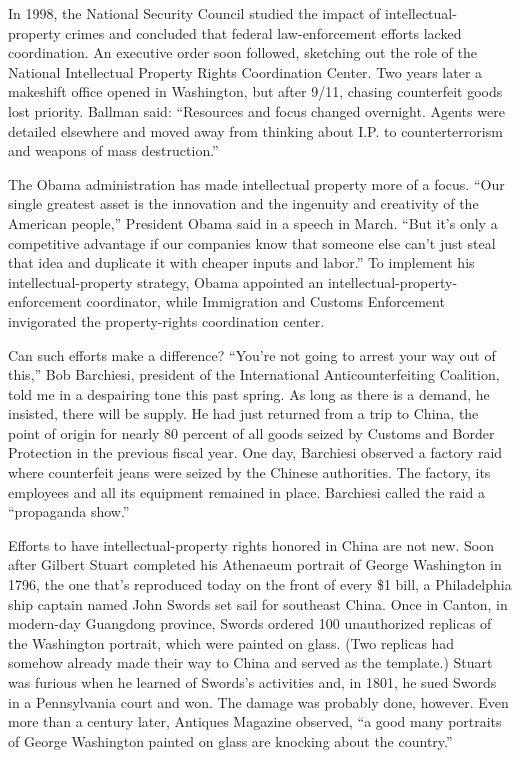﻿\documentclass[12pt]{article}
\begin{document}
In 1998, the National Security Council studied the impact of intellectual- property crimes and
concluded that federal law-enforcement efforts lacked coordination. An executive order soon
followed, sketching out the role of the National Intellectual Property Rights Coordination Center.
Two years later a makeshift office opened in Washington, but after 9/11, chasing counterfeit goods
lost priority. Ballman said: ``Resources and focus changed overnight. Agents were detailed elsewhere
and moved away from thinking about I.P. to counterterrorism and weapons of mass destruction.''

The Obama administration has made intellectual property more of a focus. ``Our single greatest asset
is the innovation and the ingenuity and creativity of the American people,'' President Obama said in
a speech in March. ``But it's only a competitive advantage if our companies know that someone else
can't just steal that idea and duplicate it with cheaper inputs and labor.'' To implement his
intellectual-property strategy, Obama appointed an intellectual-property-enforcement coordinator,
while Immigration and Customs Enforcement invigorated the property-rights coordination center.

Can such efforts make a difference? ``You're not going to arrest your way out of this,'' Bob
Barchiesi, president of the International Anticounterfeiting Coalition, told me in a despairing tone
this past spring. As long as there is a demand, he insisted, there will be supply. He had just
returned from a trip to China, the point of origin for nearly 80 percent of all goods seized by
Customs and Border Protection in the previous fiscal year. One day, Barchiesi observed a factory
raid where counterfeit jeans were seized by the Chinese authorities. The factory, its employees and
all its equipment remained in place. Barchiesi called the raid a ``propaganda show.''

Efforts to have intellectual-property rights honored in China are not new. Soon after Gilbert Stuart
completed his Athenaeum portrait of George Washington in 1796, the one that's reproduced today on
the front of every \$1 bill, a Philadelphia ship captain named John Swords set sail for southeast
China. Once in Canton, in modern-day Guangdong province, Swords ordered 100 unauthorized replicas of
the Washington portrait, which were painted on glass. (Two replicas had somehow already made their
way to China and served as the template.) Stuart was furious when he learned of Swords's activities
and, in 1801, he sued Swords in a Pennsylvania court and won. The damage was probably done, however.
Even more than a century later, Antiques Magazine observed, ``a good many portraits of George
Washington painted on glass are knocking about the country.''
\end{document}

